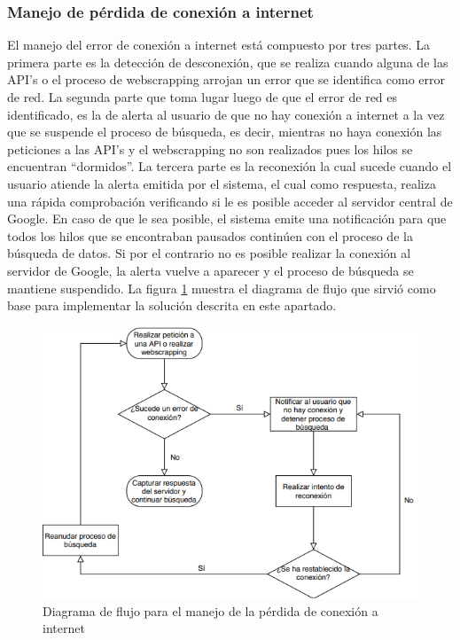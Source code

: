 \subsubsection{Manejo de pérdida de conexión a internet}
\noindent El manejo del error de conexión a internet está compuesto por tres partes. La primera parte es la detección de desconexión, que se realiza cuando alguna de las API’s o el proceso de webscrapping arrojan un error que se identifica como error de red. La segunda parte que toma lugar luego de que el error de red es identificado, es la de alerta al usuario de que no hay conexión a internet a la vez que se suspende el proceso de búsqueda, es decir, mientras no haya conexión las peticiones a las API’s y el webscrapping no son realizados pues los hilos se encuentran “dormidos”. La tercera parte es la reconexión la cual sucede cuando el usuario atiende la alerta emitida por el sistema, el cual como respuesta, realiza una rápida comprobación verificando si le es posible acceder al servidor central de Google. En caso de que le sea posible, el sistema emite una notificación para que todos los hilos que se encontraban pausados continúen con el proceso de la búsqueda de datos. Si por el contrario no es posible realizar la conexión al servidor de Google, la alerta vuelve a aparecer y el proceso de búsqueda se mantiene suspendido. La figura \ref{Desconexion} muestra el diagrama de flujo que sirvió como base para implementar la solución descrita en este apartado.

\begin{figure}[H]
    \centering
    \includegraphics[scale=0.7]{Capitulo4/imagenes/diagramaDesconexion.png}
    \caption{Diagrama de flujo para el manejo de la pérdida de conexión a internet}
    \label{Desconexion}
\end{figure}

